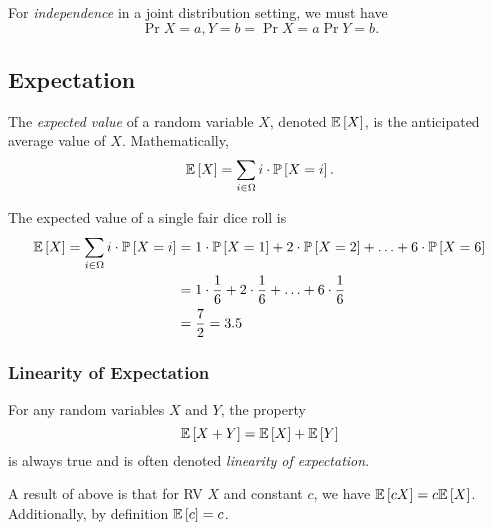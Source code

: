 \begin{definition}[Independence]
    For \textit{independence} in a joint distribution setting, we must have \[ \Pr{X = a, Y = b} = \Pr{X = a} \Pr{Y = b}. \]
\end{definition}

\subsection{Expectation}
\begin{definition}
    The \textit{expected value} of a random variable $X$, denoted $\mathbb{E}\left[ X \right]$, is the anticipated average value of $X$. Mathematically, \[ \mathbb{E}\left[ X \right] = \sum_{i \in \Omega} i \cdot \mathbb{P}\left[ X = i \right]. \]
\end{definition}

\begin{example}
    The expected value of a single fair dice roll is \begin{align*} \mathbb{E}\left[ X \right] = \sum_{i \in \Omega} i \cdot \mathbb{P}\left[ X = i \right] &= 1 \cdot \mathbb{P}\left[ X = 1 \right] + 2 \cdot \mathbb{P}\left[ X = 2 \right] + \ldots + 6 \cdot \mathbb{P}\left[ X = 6 \right] \\
    &= 1 \cdot \frac{1}{6} + 2 \cdot \frac{1}{6} + \ldots + 6 \cdot \frac{1}{6} \\
    &= \frac{7}{2} = 3.5
    \end{align*} 
\end{example}

\subsubsection{Linearity of Expectation}
For any random variables $X$ and $Y$, the property \[ \mathbb{E}\left[ X+Y \right] = \mathbb{E}\left[ X \right] + \mathbb{E}\left[ Y \right] \] is always true and is often denoted \textit{linearity of expectation}. 

A result of above is that for RV $X$ and constant $c$, we have $\mathbb{E}\left[ cX \right] = c\mathbb{E}\left[ X \right]$. Additionally, by definition $\mathbb{E}\left[ c \right] = c$. 